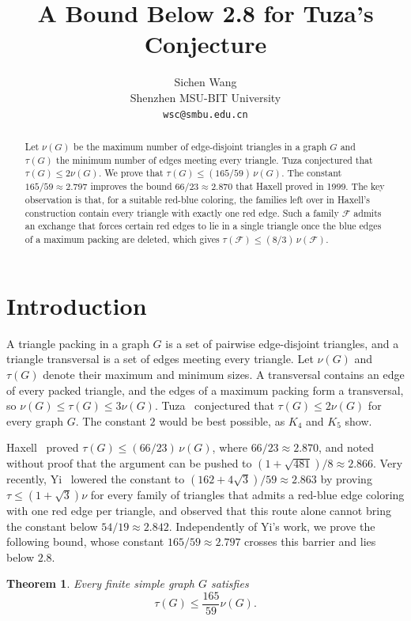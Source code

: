 \documentclass[11pt]{article}
\title{A Bound Below 2.8 for Tuza's Conjecture}
\author{Sichen Wang\\ \small Shenzhen MSU-BIT University\\ \small\texttt{wsc@smbu.edu.cn}}
\date{}
\newtheorem{theorem}{Theorem}
\theoremstyle{remark}
\newcommand{\F}{\mathcal F}
\begin{document}
\maketitle
\begin{abstract}
Let $\nu(G)$ be the maximum number of edge-disjoint triangles in a graph $G$ and $\tau(G)$ the minimum number of edges meeting every triangle. Tuza conjectured that $\tau(G)\le2\nu(G)$. We prove that $\tau(G)\le(165/59)\,\nu(G)$. The constant $165/59\approx2.797$ improves the bound $66/23\approx2.870$ that Haxell proved in 1999. The key observation is that, for a suitable red-blue coloring, the families left over in Haxell's construction contain every triangle with exactly one red edge. Such a family $\F$ admits an exchange that forces certain red edges to lie in a single triangle once the blue edges of a maximum packing are deleted, which gives $\tau(\F)\le(8/3)\,\nu(\F)$.
\end{abstract}

\section{Introduction}

A triangle packing in a graph $G$ is a set of pairwise edge-disjoint triangles, and a triangle transversal is a set of edges meeting every triangle. Let $\nu(G)$ and $\tau(G)$ denote their maximum and minimum sizes. A transversal contains an edge of every packed triangle, and the edges of a maximum packing form a transversal, so $\nu(G)\le\tau(G)\le3\nu(G)$. Tuza~\cite{Tuza} conjectured that $\tau(G)\le2\nu(G)$ for every graph $G$. The constant $2$ would be best possible, as $K_4$ and $K_5$ show.

Haxell~\cite{Haxell} proved $\tau(G)\le(66/23)\,\nu(G)$, where $66/23\approx2.870$, and noted without proof that the argument can be pushed to $(1+\sqrt{481})/8\approx2.866$. Very recently, Yi~\cite{Yi} lowered the constant to $(162+4\sqrt3)/59\approx2.863$ by proving $\tau\le(1+\sqrt3)\nu$ for every family of triangles that admits a red-blue edge coloring with one red edge per triangle, and observed that this route alone cannot bring the constant below $54/19\approx2.842$. Independently of Yi's work, we prove the following bound, whose constant $165/59\approx2.797$ crosses this barrier and lies below $2.8$.

\begin{theorem}\label{thm:main}
Every finite simple graph $G$ satisfies
\[
 \tau(G)\le\frac{165}{59}\nu(G).
\]
\end{theorem}
\end{document}
